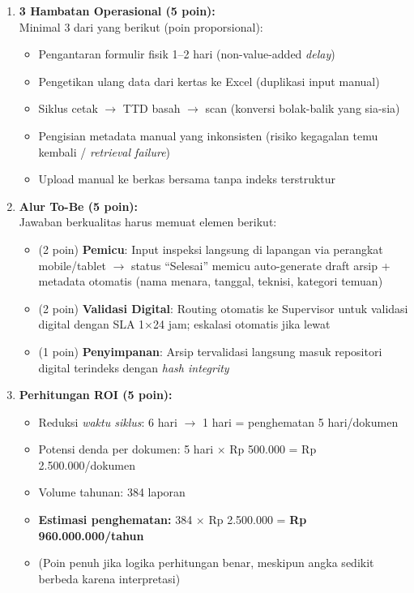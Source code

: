 \documentclass[12pt,a4paper]{report}
\begin{document}
\begin{enumerate}[leftmargin=*, label=\textbf{D1.\alph*}]

\item \textbf{3 Hambatan Operasional (5 poin):}\\
Minimal 3 dari yang berikut (poin proporsional):
\begin{itemize}[nosep]
    \item Pengantaran formulir fisik 1--2 hari (non-value-added \textit{delay})
    \item Pengetikan ulang data dari kertas ke Excel (duplikasi input manual)
    \item Siklus cetak $\rightarrow$ TTD basah $\rightarrow$ scan (konversi bolak-balik yang sia-sia)
    \item Pengisian metadata manual yang inkonsisten (risiko kegagalan temu kembali / \textit{retrieval failure})
    \item Upload manual ke berkas bersama tanpa indeks terstruktur
\end{itemize}

\item \textbf{Alur To-Be (5 poin):}\\
Jawaban berkualitas harus memuat elemen berikut:
\begin{itemize}[nosep]
    \item (2 poin) \textbf{Pemicu}: Input inspeksi langsung di lapangan via perangkat mobile/tablet $\rightarrow$ status ``Selesai'' memicu auto-generate draft arsip + metadata otomatis (nama menara, tanggal, teknisi, kategori temuan)
    \item (2 poin) \textbf{Validasi Digital}: Routing otomatis ke Supervisor untuk validasi digital dengan SLA 1$\times$24 jam; eskalasi otomatis jika lewat
    \item (1 poin) \textbf{Penyimpanan}: Arsip tervalidasi langsung masuk repositori digital terindeks dengan \textit{hash integrity}
\end{itemize}

\item \textbf{Perhitungan ROI (5 poin):}
\begin{itemize}[nosep]
    \item Reduksi \textit{waktu siklus}: 6 hari $\rightarrow$ 1 hari = penghematan 5 hari/dokumen
    \item Potensi denda per dokumen: 5 hari $\times$ Rp 500.000 = Rp 2.500.000/dokumen
    \item Volume tahunan: 384 laporan
    \item \textbf{Estimasi penghematan:} 384 $\times$ Rp 2.500.000 = \textbf{Rp 960.000.000/tahun}
    \item (Poin penuh jika logika perhitungan benar, meskipun angka sedikit berbeda karena interpretasi)
\end{itemize}

\end{enumerate}
\end{document}
